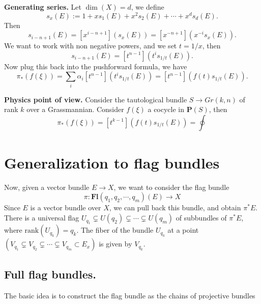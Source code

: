 \documentclass[a4paper,11pt]{article}
\begin{document}
\bigskip
\noindent\textbf{Generating series.} Let $\dim(X) = d$, we define
\begin{equation}
s_x (E) := 1 + x s_1(E) + x^2 s_2(E) + \cdots + x^d s_d (E).
\end{equation}
Then
\begin{equation}
    s_{i-n+1}(E) = [x^{i-n+1}](s_x(E)) = [x^{-n+1}](x^{-i}s_x(E)).
\end{equation}
We want to work with non negative powers, and we set $t = 1/x$, then
\begin{equation}
    s_{i-n+1}(E) = [t^{n-1}](t^i s_{1/t}(E)).
\end{equation}
Now plug this back into the pushforward formula, we have
\begin{equation}
    \pi_*(f(\xi)) = \sum_i \alpha_i [t^{n-1}](t^i s_{1/t}(E)) = [t^{n-1}] (f(t) s_{1/t}(E)).
\end{equation}

\bigskip
\noindent\textbf{Physics point of view.} 
Consider the tautological bundle $S \to Gr(k,n)$ of rank $k$ over a Grassmannian. Consider $f(\xi)$ a cocycle in $\mathbf{P}(S)$, then
\begin{equation}
    \pi_*(f(\xi)) = [t^{k-1}](f(t) s_{1/t}(E)) = \oint_{}
\end{equation}


\section{Generalization to flag bundles}
Now, given a vector bundle $E \to X$, we want to consider the flag bundle
\begin{equation}
    \pi: \mathbf{Fl}(q_1, q_2, \cdots, q_m)(E) \to X
\end{equation}
Since $E$ is a vector bundle over $X$, we can pull back this bundle, and obtain $\pi^* E$. There is a universal flag $U_{q_1} \subsetneq U(q_2) \subsetneq \cdots \subsetneq U(q_m)$ of subbundles of $\pi^* E$, where $\mathrm{rank}(U_{q_k}) = q_k$. The fiber of the bundle $U_{q_k}$ at a point $(V_{q_1} \subsetneq V_{q_2} \subsetneq \cdots \subsetneq V_{q_m} \subset E_x)$ is given by $V_{q_k}$.

\subsection{Full flag bundles.} The basic idea is to construct the flag bundle as the chains of projective bundles
\end{document}
